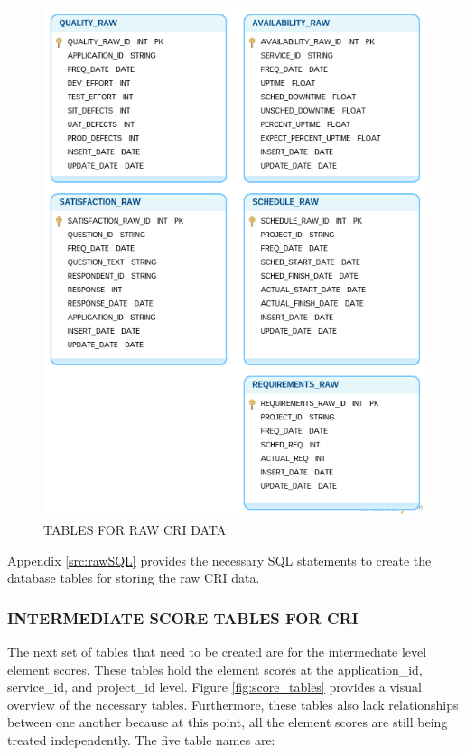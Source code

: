 \documentclass[SDSUThesis.tex]{subfiles}
\begin{document}
           \begin{figure}[htb]
                \centering
                \includegraphics[scale=.52]{images/raw_tables.png}
                \caption{TABLES FOR RAW CRI DATA}
                \label{fig:raw}
            \end{figure}
            
            Appendix \ref{src:rawSQL} provides the necessary SQL statements to create the 
            database tables for storing the raw CRI data.  
            
        \subsubsection{INTERMEDIATE SCORE TABLES FOR CRI}
            The next set of tables that need to be created are for the 
            intermediate level element scores.  These tables hold the
            element scores at the application\_id, service\_id, and project\_id
            level.  Figure \ref{fig:score_tables} provides a visual overview
            of the necessary tables.  Furthermore, these tables also lack
            relationships between one another because at this point, all the
            element scores are still being treated independently.  The five
            table names are:
            
\end{document}

